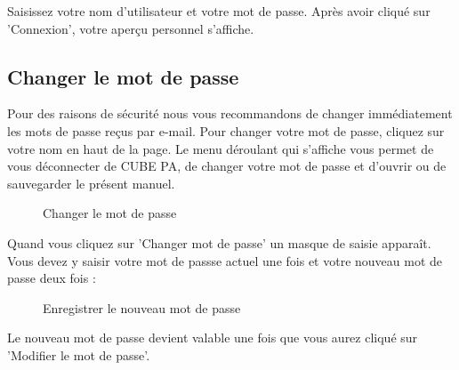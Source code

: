 Saisissez votre nom d'utilisateur et votre mot de passe. Après avoir cliqué sur 'Connexion', votre aperçu personnel s'affiche.

\subsection{Changer le mot de passe}
\label{bkm:Ref434828103}

Pour des raisons de sécurité nous vous recommandons de changer immédiatement les mots de passe reçus par e-mail. Pour changer votre mot de passe, cliquez sur votre nom en haut de la page. Le menu déroulant qui s'affiche vous permet de vous déconnecter de CUBE PA, de changer votre mot de passe et d'ouvrir ou de sauvegarder le présent manuel.

\begin{figure}[H]
\caption{Changer le mot de passe}
\end{figure}

Quand vous cliquez sur 'Changer mot de passe' un masque de saisie apparaît. Vous devez y saisir votre mot de passse actuel une fois et votre nouveau mot de passe deux fois :

\begin{figure}[H]
\caption{Enregistrer le nouveau mot de passe}
\end{figure}

Le nouveau mot de passe devient valable une fois que vous aurez cliqué sur 'Modifier le mot de passe'.

